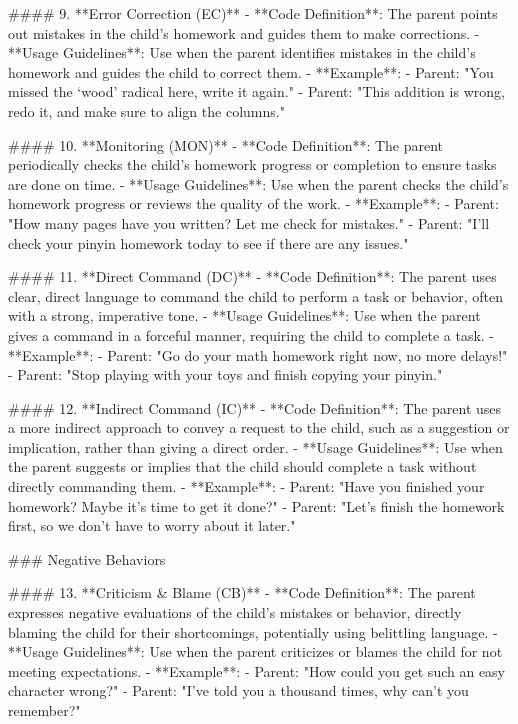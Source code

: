 \begin{spverbatim}
#### 9. **Error Correction (EC)**
- **Code Definition**: The parent points out mistakes in the child’s homework and guides them to make corrections.
- **Usage Guidelines**: Use when the parent identifies mistakes in the child’s homework and guides the child to correct them.
- **Example**:  
  - Parent: "You missed the ‘wood’ radical here, write it again."
  - Parent: "This addition is wrong, redo it, and make sure to align the columns."

#### 10. **Monitoring (MON)**
- **Code Definition**: The parent periodically checks the child’s homework progress or completion to ensure tasks are done on time.
- **Usage Guidelines**: Use when the parent checks the child’s homework progress or reviews the quality of the work.
- **Example**:  
  - Parent: "How many pages have you written? Let me check for mistakes."
  - Parent: "I’ll check your pinyin homework today to see if there are any issues."

#### 11. **Direct Command (DC)**
- **Code Definition**: The parent uses clear, direct language to command the child to perform a task or behavior, often with a strong, imperative tone.
- **Usage Guidelines**: Use when the parent gives a command in a forceful manner, requiring the child to complete a task.
- **Example**:  
  - Parent: "Go do your math homework right now, no more delays!"
  - Parent: "Stop playing with your toys and finish copying your pinyin."

#### 12. **Indirect Command (IC)**
- **Code Definition**: The parent uses a more indirect approach to convey a request to the child, such as a suggestion or implication, rather than giving a direct order.
- **Usage Guidelines**: Use when the parent suggests or implies that the child should complete a task without directly commanding them.
- **Example**:  
  - Parent: "Have you finished your homework? Maybe it's time to get it done?"
  - Parent: "Let’s finish the homework first, so we don’t have to worry about it later."

### Negative Behaviors

#### 13. **Criticism & Blame (CB)**
- **Code Definition**: The parent expresses negative evaluations of the child’s mistakes or behavior, directly blaming the child for their shortcomings, potentially using belittling language.
- **Usage Guidelines**: Use when the parent criticizes or blames the child for not meeting expectations.
- **Example**:  
  - Parent: "How could you get such an easy character wrong?"
  - Parent: "I’ve told you a thousand times, why can't you remember?"


\end{spverbatim}

